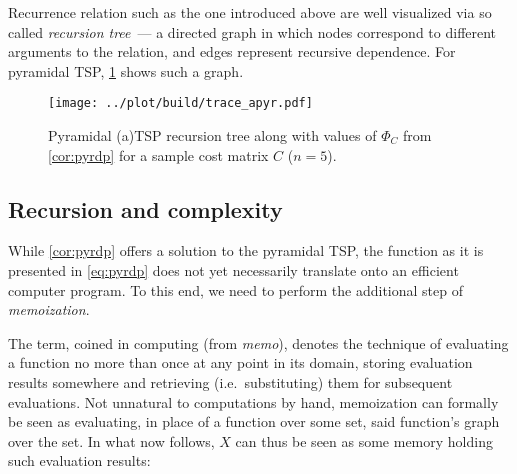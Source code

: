 \documentclass[index=totoc,bibliography=totoc]{scrartcl}
\newcommand{\annotation}[1]{\marginpar{\small\itshape\color{green}#1}}
\numberwithin{equation}{section}
\numberwithin{figure}{section}
\numberwithin{table}{section}
\let\defstyle\itshape
\begin{document}
Recurrence relation such as the one introduced above are well visualized
via so called {\defstyle recursion tree}~--- a directed graph in which
nodes correspond to different arguments to the relation, and edges
represent recursive dependence.  For pyramidal TSP, \cref{fig:pyratrace}
shows such a graph.

\begin{figure}[htbp]
  \centering
  \texttt{[image: ../plot/build/trace\_apyr.pdf]}
\caption{Pyramidal (a)TSP recursion tree along with values of $\Phi_C$
  from \cref{cor:pyrdp} for a sample cost matrix $C$ ($n=5$).}
\label{fig:pyratrace}
\end{figure}


\subsection{Recursion and complexity}

While \cref{cor:pyrdp} offers a solution to the pyramidal TSP, the
function as it is presented in \cref{eq:pyrdp}
does not yet necessarily translate onto an efficient computer program.
To this end, we need to perform the additional step of {\defstyle memoization}.

The term, coined in computing (from {\defstyle memo}), denotes the
technique of evaluating a function no more than once at any point in its domain,
storing evaluation results somewhere and retrieving (i.e.\ substituting) them for
subsequent evaluations.
Not unnatural to computations by hand, memoization can formally be seen as
evaluating, in place of a function over some set, said function's graph over
the set.
In what now follows, $X$ can thus be seen as some memory holding such evaluation results:
\end{document}
